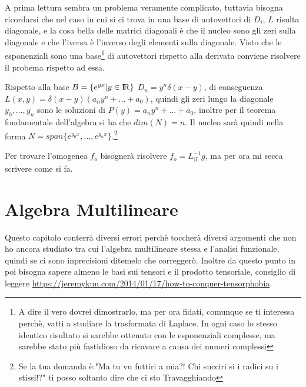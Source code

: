 \documentclass[11pt,a4paper]{report}
\theoremstyle{definition}
\theoremstyle{plain}
\theoremstyle{plain}
\begin{document}
			A prima lettura sembra un problema veramente complicato, tuttavia bisogna ricordarsi che nel caso in cui si ci trova in una base di autovettori di $D_i$, $L$ risulta diagonale, e la cosa bella delle matrici diagonali è che il nucleo sono gli zeri sulla diagonale e che l'iversa è l'inverso degli elementi sulla diagonale.\newline
			Visto che le esponenziali sono una base\footnote{A dire il vero dovrei dimostrarlo, ma per ora fidati, comunque se ti interessa perchè, vatti a studiare la trasformata di Laplace. In ogni caso lo stesso identico risultato si sarebbe ottenuto con le esponenziali complesse, ma sarebbe stato più fastidioso da ricavare a causa dei numeri complessi} di autovettori rispetto alla derivata conviene risolvere il probema rispetto ad essa.\newline

			Rispetto alla base $B=\{e^{yx}|y \in \rm I\!R\}$ $D_n=y^n\delta(x-y)$, di conseguenza $L(x,y)=\delta(x-y)(a_ny^n+\dots+a_0)$, quindi gli zeri lungo la diagonale $y_0,\dots,y_n$ sono le soluzioni di $P(y)=a_ny^n+\dots+a_0$, inoltre per il teorema fondamentale dell'algebra si ha che $dim(N)=n$. Il nucleo sarà quindi nella forma $N=span\{e^{y_0x},\dots,e^{y_nx}\}$.\footnote{Se la tua domanda è:"Ma tu vu futtiri a mia?! Chi succiri si i radici su i stissi!?" ti posso soltanto dire che ci sto Travagghiando}\newline

			Per trovare l'omogenea $f_o$ bisognerà risolvere $f_o=L^{-1}_{|I}g$, ma per ora mi secca scrivere come si fa.










	\chapter{Algebra Multilineare}

		Questo capitolo conterrà diversi errori perchè toccherà diversi argomenti che non ho ancora studiato tra cui l'algebra multilineare stessa e l'analisi funzionale, quindi se ci sono inprecisioni ditemelo che correggerò.\newline
		Inoltre da questo punto in poi bisogna sapere almeno le basi sui tensori e il prodotto tensoriale, consiglio di leggere \href{url}{https://jeremykun.com/2014/01/17/how-to-conquer-tensorphobia}.
\end{document}
